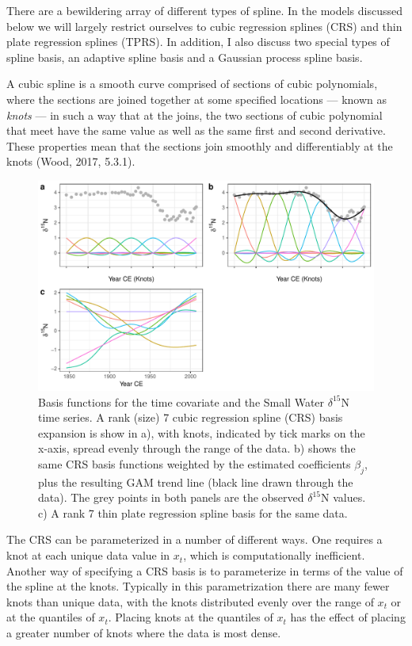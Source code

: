 \documentclass[12pt,]{article}
\begin{document}
There are a bewildering array of different types of spline. In the
models discussed below we will largely restrict ourselves to cubic
regression splines (CRS) and thin plate regression splines (TPRS). In
addition, I also discuss two special types of spline basis, an adaptive
spline basis and a Gaussian process spline basis.

A cubic spline is a smooth curve comprised of sections of cubic
polynomials, where the sections are joined together at some specified
locations --- known as \emph{knots} --- in such a way that at the joins,
the two sections of cubic polynomial that meet have the same value as
well as the same first and second derivative. These properties mean that
the sections join smoothly and differentiably at the knots (Wood, 2017,
5.3.1).

\begin{figure}

{\centering \includegraphics[width=0.8\linewidth]{manuscript_files/figure-latex/basis-function-example-plot-1} 

}

\caption{Basis functions for the time covariate and the Small Water $\delta^{15}\text{N}$ time series. A rank (size) 7 cubic regression spline (CRS) basis expansion is show in a), with knots, indicated by tick marks on the x-axis, spread evenly through the range of the data. b) shows the same CRS basis functions weighted by the estimated coefficients $\beta_j$, plus the resulting GAM trend line (black line drawn through the data). The grey points in both panels are the observed $\delta^{15}\text{N}$ values. c) A rank 7 thin plate regression spline basis for the same data.}\label{fig:basis-function-example-plot}
\end{figure}

The CRS can be parameterized in a number of different ways. One requires
a knot at each unique data value in \(x_t\), which is computationally
inefficient. Another way of specifying a CRS basis is to parameterize in
terms of the value of the spline at the knots. Typically in this
parametrization there are many fewer knots than unique data, with the
knots distributed evenly over the range of \(x_t\) or at the quantiles
of \(x_t\). Placing knots at the quantiles of \(x_t\) has the effect of
placing a greater number of knots where the data is most dense.
\end{document}
